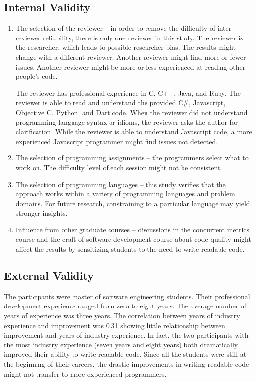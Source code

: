 \documentclass[conference]{IEEEtran}
\begin{document}
\subsection{Internal Validity}
\begin{enumerate}
  \item The selection of the reviewer – in order to remove the difficulty of inter-reviewer reliability, there is only one reviewer in this study. The reviewer is the researcher, which leads to possible researcher bias. The results might change with a different reviewer. Another reviewer might find more or fewer issues. Another reviewer might be more or less experienced at reading other people’s code.

The reviewer has professional experience in C, C++, Java, and Ruby. The reviewer is able to read and understand the provided C#, Javascript, Objective C, Python, and Dart code. When the reviewer did not understand programming language syntax or idioms, the reviewer asks the author for clarification. While the reviewer is able to understand Javascript code, a more experienced Javascript programmer might find issues not detected.
  \item The selection of programming assignments – the programmers select what to work on. The difficulty level of each session might not be consistent.
  \item The selection of programming languages – this study verifies that the approach works within a variety of programming languages and problem domains. For future research, constraining to a particular language may yield stronger insights.
  \item Influence from other graduate courses – discussions in the concurrent metrics course and the craft of software development course about code quality might affect the results by sensitizing students to the need to write readable code.
\end{enumerate}

\subsection{External Validity}
The participants were master of software engineering students. Their professional development experience ranged from zero to eight years. The average number of years of experience was three years. The correlation between years of industry experience and improvement was 0.31 showing little relationship between improvement and years of industry experience. In fact, the two participants with the most industry experience (seven years and eight years) both dramatically improved their ability to write readable code. Since all the students were still at the beginning of their careers, the drastic improvements in writing readable code might not transfer to more experienced programmers.
\end{document}

